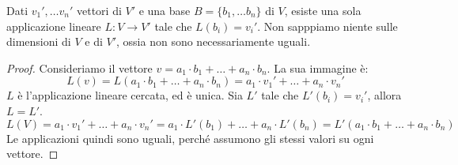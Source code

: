 \begin{prop}
Dati $v_1', \ldots v_n'$ vettori di $V'$ e una base $B = \{ b_1, \dots b_n \}$ di $V$, esiste una sola applicazione lineare $L : V \to V'$ tale che $L(b_i) = v_i'$. Non sapppiamo niente sulle dimensioni di $V$ e di $V'$, ossia non sono necessariamente uguali.
\end{prop}
\begin{proof}
Consideriamo il vettore $v = a_1 \cdot b_1 + \ldots + a_n \cdot b_n$. La sua immagine \`e:
\[
L(v) = L(a_1 \cdot b_1 + \ldots + a_n \cdot b_n) = a_1 \cdot v_1' + \ldots + a_n \cdot v_n'
\]
$L$ \`e l'applicazione lineare cercata, ed \`e unica. Sia $L'$ tale che $L'(b_i) = v_i'$, allora $L = L'$.
\[
L(V) = a_1 \cdot v_1' + \ldots + a_n \cdot v_n' = a_1 \cdot L'(b_1) + \ldots + a_n \cdot L'(b_n) =  L' (a_1 \cdot b_1 + \ldots + a_n \cdot b_n)
\]
Le applicazioni quindi sono uguali, perch\'e assumono gli stessi valori su ogni vettore.
\end{proof}
